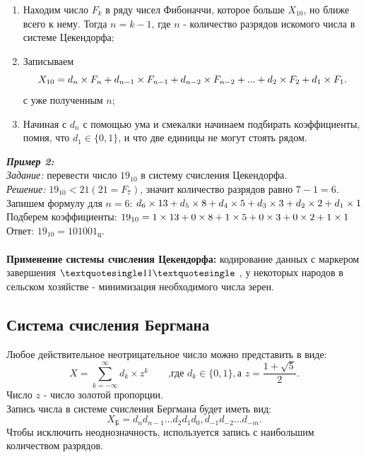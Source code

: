 \begin{enumerate}
\item Находим число $F_{k}$ в ряду чисел Фибоначчи, которое больше $X_{10}$, но ближе всего к нему. Тогда $n = k - 1$, где $n$ - количество разрядов искомого числа в системе Цекендорфа;
\item Записываем $$ X_{10} = d_{n}\times F_{n} + d_{n-1}\times F_{n-1} + d_{n-2}\hm\times F_{n-2}\hm + ...\hm + d_{2}\times F_{2} + d_{1}\hm\times F_{1}.$$ с уже полученным $n$;
\item Начиная с $d_{n}$ с помощью ума и смекалки начинаем подбирать коэффициенты, помня, что $d_{1} \in \{0,1\}$, и что две единицы не могут стоять рядом.
\end{enumerate}

\emph{\textbf{Пример 2:}}
\\\emph{Задание:} перевести число $19_{10}$ в систему счисления Цекендорфа.
\\\emph{Решение:} $19_{10} < 21 (21 = F_{7})$, значит количество разрядов равно $7 - 1 = 6$.
\\Запишем формулу для $n = 6$: $d_{6}\times 13 + d_{5}\times 8 + d_{4}\hm\times 5 + d_{3}\hm\times 3 + d_{2}\hm\times 2\hm + d_{1}\hm\times 1$
\\Подберем коэффициенты: $19_{10} = 1\times 13 + 0\times 8 + 1\hm\times 5 + 0\hm\times 3 + 0\hm\times 2\hm + 1\hm\times 1$
\\Ответ:  $19_{10} = 101001_{\mbox{ц}}$.
\\
\\\textbf{Применение системы счисления Цекендорфа:} кодирование данных с маркером завершения $ \textquotesingle 11\textquotesingle $ , у некоторых народов в сельском хозяйстве - минимизация необходимого числа зерен.

\subsection{Система счисления Бергмана}
Любое действительное неотрицательное число можно представить в виде:
$$ X = \sum^{\infty}_{k = -\infty} d_{k}\times z^{k} \qquad \mbox{,где  } d_{k} \in \{0,1\},\mbox{а } z = \frac{1+\sqrt{5}}{2}.$$
Число $z$ - число золотой пропорции.
\\Запись числа в системе счисления Бергмана будет иметь вид: $$X_{\mbox{Б}} = d_{n}d_{n-1}...d_{2}d_{1}d_{0},d_{-1}d_{-2}...d_{-m}.$$
Чтобы исключить неоднозначность, используется запись с наибольшим количеством разрядов.

